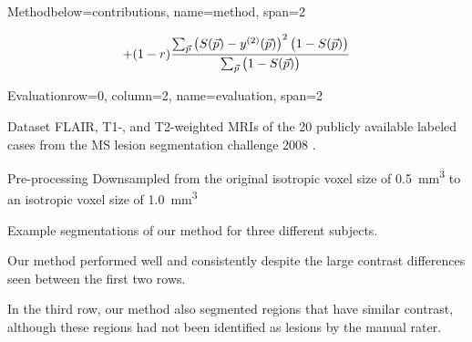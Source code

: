 \documentclass[%
portrait,paperwidth=841mm,paperheight=1180mm,%
margin=2cm,
fontscale=0.32
]{baposter}
\newcommand{\vect}[1]{\vec{#1}}
\begin{document}
\begin{poster}
\begin{headerblock}{Method}{below=contributions, name=method, span=2}
\begin{compactitem}
\begin{equation}
+(1-r)\frac{\textstyle\sum_{\vect{p}} \left(S(\vect{p}) -
y^{(2)}(\vect{p})\right)^2 \big(1 - S(\vect{p})\big)}{%
\textstyle\sum_{\vect{p}}\big(1 - S(\vect{p})\big)}
\end{equation}
\end{compactitem}
\vspace{1.5em}
\end{headerblock}


\begin{headerblock}{Evaluation}{row=0, column=2, name=evaluation, span=2}

\begin{compactdesc}
\item[Dataset] FLAIR, T1-, and T2-weighted MRIs of the
20 publicly available labeled cases from the MS lesion segmentation challenge
2008 \cite{styner20083d}.
\item[Pre-processing] Downsampled from the original isotropic voxel
size of \SI{0.5}{\cubic\milli\metre} to an isotropic voxel size of
\SI{1.0}{\cubic\milli\metre}
\end{compactdesc}
\begin{compactitem}
\item Example segmentations of our method for three different subjects.
\item Our method performed well and consistently despite the
large contrast differences seen between the first two rows.
\item In the third row, our method also segmented regions that have similar
contrast, although these regions had not been identified as lesions by the
manual rater.
\end{compactitem}

\def\MRIwidth{0.13\textwidth}
\begin{center}
\end{center}
\end{headerblock}
\end{poster}
\end{document}
